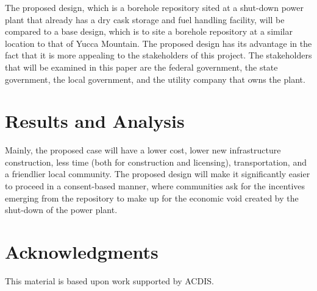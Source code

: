 \documentclass{anstrans}
\begin{document}
The proposed design, which is a borehole repository sited at a shut-down power
plant that already has a dry cask storage and fuel handling facility, will be
 compared to a base design, which is to site a borehole repository 
at a similar location to that of Yucca Mountain. The proposed design has its 
advantage in the fact that it is more appealing to the stakeholders of this 
project. The stakeholders that will be examined in this paper are the federal 
government, the state government, the local government, and the utility company 
that owns the plant.




\section{Results and Analysis}



Mainly, the proposed case will have a lower cost, lower new infrastructure 
construction, less time (both for construction and licensing), transportation, 
and a friendlier local community. The proposed design will make it 
significantly easier to proceed in a consent-based manner, where communities 
ask for the incentives emerging from the repository to make up for the economic
 void created by the shut-down of the power plant. 


\section{Acknowledgments}

This material is based upon work supported by ACDIS.



\end{document}
